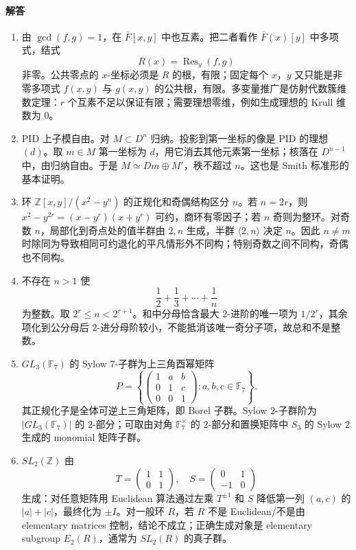 \documentclass[UTF8,12pt]{ctexart}
\begin{document}
\paragraph{解答}
\begin{enumerate}[label=\textbf{\arabic*.},leftmargin=2.2em]
\item 由 \(\gcd(f,g)=1\)，在 \(\overline F[x,y]\) 中也互素。把二者看作 \(\overline F(x)[y]\) 中多项式，结式
\[
R(x)=\operatorname{Res}_y(f,g)
\]
非零。公共零点的 \(x\)-坐标必须是 \(R\) 的根，有限；固定每个 \(x\)，\(y\) 又只能是非零多项式 \(f(x,y)\) 与 \(g(x,y)\) 的公共根，有限。多变量推广是仿射代数簇维数定理：\(r\) 个互素不足以保证有限；需要理想零维，例如生成理想的 Krull 维数为 \(0\)。
\item PID 上子模自由。对 \(M\subset D^n\) 归纳。投影到第一坐标的像是 PID 的理想 \((d)\)。取 \(m\in M\) 第一坐标为 \(d\)，用它消去其他元素第一坐标；核落在 \(D^{n-1}\) 中，由归纳自由。于是 \(M\simeq Dm\oplus M'\)，秩不超过 \(n\)。这也是 Smith 标准形的基本证明。
\item 环 \(\mathbb Z[x,y]/(x^2-y^n)\) 的正规化和奇偶结构区分 \(n\)。若 \(n=2r\)，则 \(x^2-y^{2r}=(x-y^r)(x+y^r)\) 可约，商环有零因子；若 \(n\) 奇则为整环。对奇数 \(n\)，局部化到奇点处的值半群由 \(2,n\) 生成，半群 \(\langle2,n\rangle\) 决定 \(n\)。因此 \(n\ne m\) 时除同为导致相同可约退化的平凡情形外不同构；特别奇数之间不同构，奇偶也不同构。
\item 不存在 \(n>1\) 使
\[
\frac12+\frac13+\cdots+\frac1n
\]
为整数。取 \(2^r\le n<2^{r+1}\)。和中分母恰含最大 \(2\)-进阶的唯一项为 \(1/2^r\)，其余项化到公分母后 \(2\)-进分母阶较小，不能抵消该唯一奇分子项，故总和不是整数。
\item \(GL_3(\mathbb F_7)\) 的 Sylow \(7\)-子群为上三角酉幂矩阵
\[
P=\left\{\begin{pmatrix}1&a&b\\0&1&c\\0&0&1\end{pmatrix}:a,b,c\in\mathbb F_7\right\}.
\]
其正规化子是全体可逆上三角矩阵，即 Borel 子群。Sylow \(2\)-子群阶为 \(|GL_3(\mathbb F_7)|\) 的 \(2\)-部分；可取由对角 \(\mathbb F_7^\times\) 的 \(2\)-部分和置换矩阵中 \(S_3\) 的 Sylow \(2\) 生成的 monomial 矩阵子群。
\item \(SL_2(\mathbb Z)\) 由
\[
T=\begin{pmatrix}1&1\\0&1\end{pmatrix},\quad
S=\begin{pmatrix}0&1\\-1&0\end{pmatrix}
\]
生成：对任意矩阵用 Euclidean 算法通过左乘 \(T^{\pm1}\) 和 \(S\) 降低第一列 \((a,c)\) 的 \(|a|+|c|\)，最终化为 \(\pm I\)。对一般环 \(R\)，若 \(R\) 不是 Euclidean/不是由 elementary matrices 控制，结论不成立；正确生成对象是 elementary subgroup \(E_2(R)\)，通常为 \(SL_2(R)\) 的真子群。
\end{enumerate}
\end{document}
